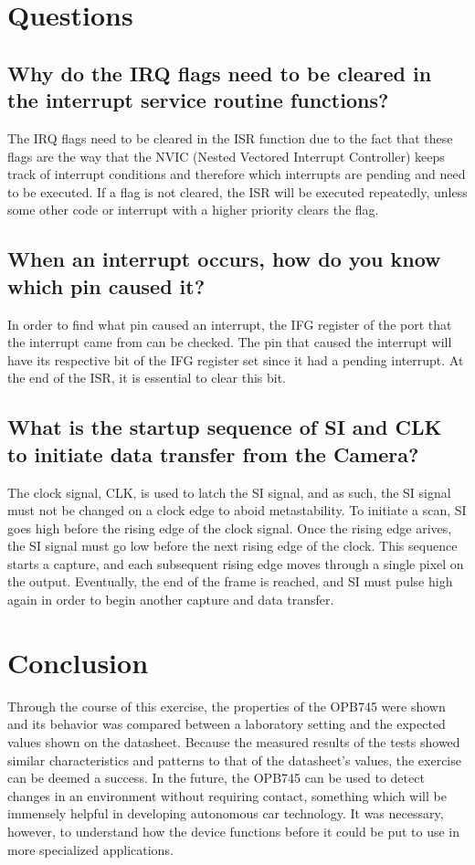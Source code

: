 \documentclass[conference]{IEEEtran}
\begin{document}
\section{Questions}

\subsection{Why do the IRQ flags need to be cleared in the interrupt service
routine functions?}

The IRQ flags need to be cleared in the ISR function due to the fact that
these flags are the way that the NVIC (Nested Vectored Interrupt Controller)
keeps track of interrupt conditions and therefore which interrupts are pending and need to be executed. If
a flag is not cleared, the ISR will be executed repeatedly, unless some other
code or interrupt with a higher priority clears the flag.

\subsection{When an interrupt occurs, how do you know which pin caused it?}

In order to find what pin caused an interrupt, the IFG register of the port
that the interrupt came from can be checked. The pin that caused the
interrupt will have its respective bit of the IFG register set since it had
a pending interrupt. At the end of the ISR, it is essential to clear this
bit.

\subsection{What is the startup sequence of SI and CLK to initiate data 
transfer from the Camera?}

The clock signal, CLK, is used to latch the SI signal, and as such, the SI
signal must not be changed on a clock edge to aboid metastability. To
initiate a scan, SI goes high before the rising edge of the clock signal.
Once the rising edge arives, the SI signal must go low before the next
rising edge of the clock. This sequence starts a capture, and each subsequent
rising edge moves through a single pixel on the output. Eventually, the end
of the frame is reached, and SI must pulse high again in order to begin
another capture and data transfer.

\section{Conclusion}
Through the course of this exercise, the properties of the OPB745 were shown and its behavior was compared between a laboratory
setting and the expected values shown on the datasheet. Because the measured results of the tests showed similar characteristics and
patterns to that of the datasheet's values, the exercise can be deemed a success. In the future, the OPB745 can be used to detect changes
in an environment without requiring contact, something which will be immensely helpful in developing autonomous car technology. It was
necessary, however, to understand how the device functions before it could be put to use in more specialized applications.
\end{document}
